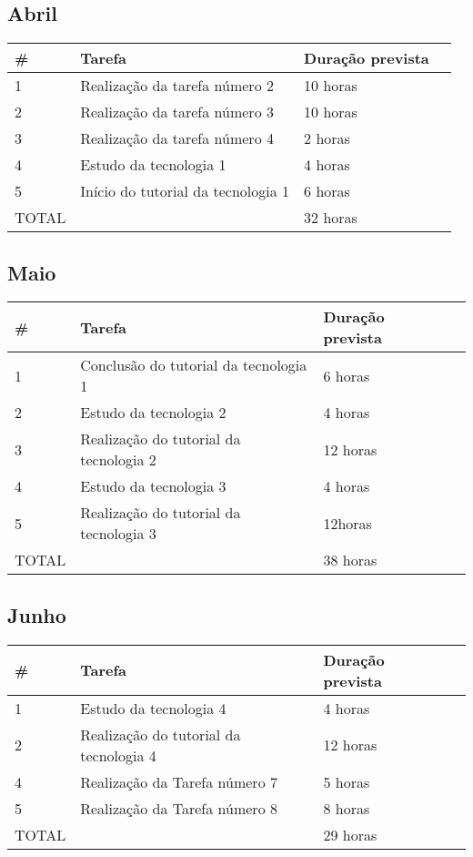 \documentclass{article}
\begin{document}
\subsection{Abril}
\begin{center}
  \begin{tabular}{ | l | l | p{5cm} | l | }
    \hline
    \# & Tarefa & Duração prevista \\ \hline
    1 & Realização da tarefa número 2 & 10 horas \\ \hline
    2 & Realização da tarefa número 3 & 10 horas \\ \hline
    3 & Realização da tarefa número 4 & 2 horas \\ \hline
    4 & Estudo da tecnologia 1 & 4 horas \\ \hline
    5 & Início do tutorial da tecnologia 1 & 6 horas \\ \hline
    TOTAL && 32 horas \\ \hline
 \end{tabular}
\end{center}

\subsection{Maio}
\begin{center}
  \begin{tabular}{ | l | l | p{5cm} | l | }
    \hline
    \# & Tarefa & Duração prevista \\ \hline
    1 & Conclusão do tutorial da tecnologia 1 & 6 horas \\ \hline
    2 & Estudo da tecnologia 2 & 4 horas \\ \hline
    3 & Realização do tutorial da tecnologia 2 & 12 horas \\ \hline
    4 & Estudo da tecnologia 3 & 4 horas \\ \hline
    5 & Realização do tutorial da tecnologia 3 & 12horas \\ \hline
    TOTAL && 38 horas \\ \hline
 \end{tabular}
\end{center}


\subsection{Junho}
\begin{center}
  \begin{tabular}{ | l | l | p{5cm} | l | }
    \hline
    \# & Tarefa & Duração prevista \\ \hline
    1 & Estudo da tecnologia 4 & 4 horas \\ \hline
    2 & Realização do tutorial da tecnologia 4 & 12 horas \\ \hline
    4 & Realização da Tarefa número 7 & 5 horas \\ \hline
    5 & Realização da Tarefa número 8 & 8 horas \\ \hline
    TOTAL && 29 horas \\ \hline
 \end{tabular}
\end{center}
\end{document}
